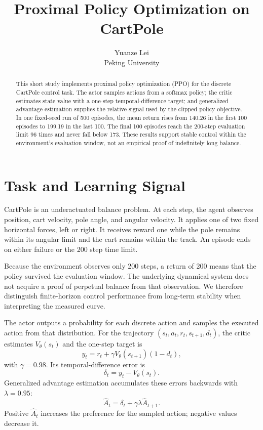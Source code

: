 \documentclass{article}
\title{Proximal Policy Optimization on CartPole}
\author{%
  Yuanze Lei \quad 2510124204\\
  Peking University
}
\begin{document}
\maketitle

\begin{abstract}
This short study implements proximal policy optimization (PPO) for the
discrete CartPole control task. The actor samples actions from a softmax
policy; the critic estimates state value with a one-step temporal-difference
target; and generalized advantage estimation supplies the relative signal used
by the clipped policy objective. In one fixed-seed run of 500 episodes, the
mean return rises from 140.26 in the first 100 episodes to 199.19 in the last
100. The final 100 episodes reach the 200-step evaluation limit 96 times and
never fall below 173. These results support stable control within the
environment's evaluation window, not an empirical proof of indefinitely long
balance.
\end{abstract}

\section{Task and Learning Signal}\label{sec:task}

CartPole \citep{brockman2016gym} is an underactuated balance problem. At each
step, the agent observes position, cart velocity, pole angle, and angular
velocity. It applies one of two fixed horizontal forces, left or right. It
receives reward one while the pole remains within its angular limit and the
cart remains within the track. An episode ends on either failure or the 200
step time limit.

Because the environment observes only 200 steps, a return of 200 means that
the policy survived the evaluation window. The underlying dynamical system
does not acquire a proof of perpetual balance from that observation. We
therefore distinguish finite-horizon control performance from long-term
stability when interpreting the measured curve.

The actor outputs a probability for each discrete action and samples the
executed action from that distribution. For the trajectory
$(s_t,a_t,r_t,s_{t+1},d_t)$, the critic estimates $V_\theta(s_t)$ and the
one-step target is
\begin{equation}\label{eq:td}
  y_t=r_t+\gamma V_\theta(s_{t+1})(1-d_t),
\end{equation}
with $\gamma=0.98$. Its temporal-difference error is
\begin{equation}\label{eq:delta}
  \delta_t=y_t-V_\theta(s_t).
\end{equation}
Generalized advantage estimation \citep{schulman2015high} accumulates
these errors backwards with $\lambda=0.95$:
\begin{equation}\label{eq:gae}
  \hat A_t=\delta_t+\gamma\lambda\hat A_{t+1}.
\end{equation}
Positive $\hat A_t$ increases the preference for the sampled action; negative
values decrease it.
\end{document}
